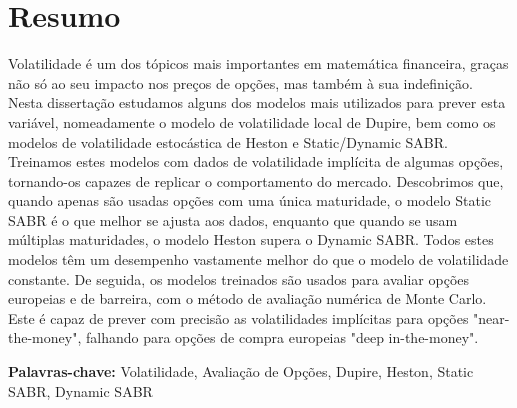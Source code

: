 
\section*{Resumo}


Volatilidade é um dos tópicos mais importantes em matemática financeira, graças não só ao seu impacto nos preços de opções, mas também à sua indefinição. Nesta dissertação estudamos alguns dos modelos mais utilizados para prever esta variável, nomeadamente o modelo de volatilidade local de Dupire, bem como os modelos de volatilidade estocástica de Heston e Static/Dynamic SABR.
Treinamos estes modelos com dados de volatilidade implícita de algumas opções, tornando-os capazes de replicar o comportamento do mercado. Descobrimos que, quando apenas são usadas opções com uma única maturidade, o modelo Static SABR é o que melhor se ajusta aos dados, enquanto que quando se usam múltiplas maturidades, o modelo Heston supera o Dynamic SABR. Todos estes modelos têm um desempenho vastamente melhor do que o modelo de volatilidade constante.
De seguida, os modelos treinados são usados para avaliar opções europeias e de barreira, com o método de avaliação numérica de Monte Carlo. Este é capaz de prever com precisão as volatilidades implícitas para opções "near-the-money", falhando para opções de compra europeias "deep in-the-money".

\vfill

\textbf{\Large Palavras-chave:} Volatilidade, Avaliação de Opções, Dupire, Heston, Static SABR, Dynamic SABR




